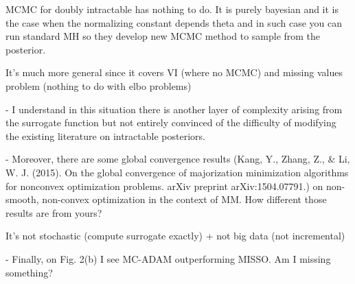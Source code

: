 \documentclass{article}
\begin{document}
MCMC for doubly intractable has nothing to do. It is purely bayesian and it is the case when the normalizing constant depends theta and in such case you can run standard MH so they develop new MCMC method to sample from the posterior.

It's much more general since it covers VI (where no MCMC) and missing values problem (nothing to do with elbo problems)

- I understand in this situation there is another layer of complexity arising from the surrogate function but not entirely convinced of the difficulty of modifying the existing literature on intractable posteriors.

- Moreover, there are some global convergence results (Kang, Y., Zhang, Z., \& Li, W. J. (2015). On the global convergence of majorization minimization algorithms for nonconvex optimization problems. arXiv preprint arXiv:1504.07791.) on non-smooth, non-convex optimization in the context of MM. How different those results are from yours?

It's not stochastic (compute surrogate exactly) + not big data (not incremental)

- Finally, on Fig. 2(b) I see MC-ADAM outperforming MISSO. Am I missing something?
\end{document}
